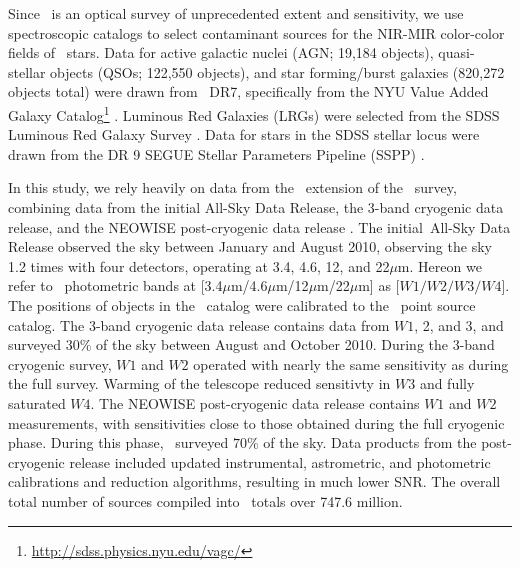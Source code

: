 Since \sdss\, is an optical survey of unprecedented extent and sensitivity, we use \sdss\, spectroscopic catalogs to select contaminant sources for the NIR-MIR color-color fields of \agb\, stars. Data for active galactic nuclei (AGN; 19,184 objects), quasi-stellar objects (QSOs; 122,550 objects), and star forming/burst galaxies (820,272 objects total) were drawn from \sdss\, DR7, specifically from the NYU Value Added Galaxy Catalog\footnote{\url{http://sdss.physics.nyu.edu/vagc/}} \citep[VAGC]{2005AJ....129.2562B}. Luminous Red Galaxies (LRGs) were selected from the SDSS Luminous Red Galaxy Survey \citep[105,631 objects, ][]{2010ApJ...710.1444K}.  Data for stars in the SDSS stellar locus were drawn from the DR 9 SEGUE Stellar Parameters Pipeline (SSPP) \citep[1,843,190 objects, ][]{2012ApJS..203...21A}.

In this study, we rely heavily on data from the \allwise\, extension of the \wise\, survey, combining data from the initial All-Sky Data Release, the 3-band cryogenic data release, and the NEOWISE post-cryogenic data release \citep{2013wise.rept....1C}. The initial \wise\,All-Sky Data Release observed the sky between January and August 2010, observing the sky 1.2 times with four detectors, operating at 3.4, 4.6, 12, and 22$\mu$m. Hereon we refer to \allwise\, photometric bands at [3.4$\mu$m/4.6$\mu$m/12$\mu$m/22$\mu$m] as [$W1/W2/W3/W4$]. The positions of objects in the \wise\, catalog were calibrated to the \twomass\, point source catalog. The 3-band cryogenic data release contains data from $W1$, 2, and 3, and surveyed $30\%$ of the sky between August and October 2010. During the 3-band cryogenic survey, $W1$ and $W2$ operated with nearly the same sensitivity as during the full survey. Warming of the telescope reduced sensitivty in $W3$ and fully saturated $W4$. The NEOWISE post-cryogenic data release contains $W1$ and $W2$ measurements, with sensitivities close to those obtained during the full cryogenic phase. During this phase, \wise\, surveyed $70\%$ of the sky. Data products from the post-cryogenic release included updated instrumental, astrometric, and photometric calibrations and reduction algorithms, resulting in much lower SNR. The overall total number of sources compiled into \allwise\, totals over 747.6 million.

